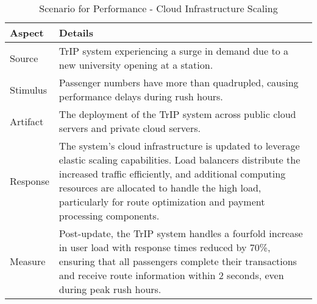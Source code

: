 \begin{table}[H]
    \centering
    \begin{tabularx}{\textwidth}{@{} lX @{}}
    \toprule
    \textbf{Aspect} & \textbf{Details} \\
    \midrule
    Source & TrIP system experiencing a surge in demand due to a new university opening at a station. \\
    Stimulus & Passenger numbers have more than quadrupled, causing performance delays during rush hours. \\
    Artifact & The deployment of the TrIP system across public cloud servers and private cloud servers. \\
    Response & The system's cloud infrastructure is updated to leverage elastic scaling capabilities. Load balancers distribute the increased traffic efficiently, and additional computing resources are allocated to handle the high load, particularly for route optimization and payment processing components. \\
    Measure & Post-update, the TrIP system handles a fourfold increase in user load with response times reduced by 70\%, ensuring that all passengers complete their transactions and receive route information within 2 seconds, even during peak rush hours. \\
    \bottomrule
    \end{tabularx}
    \caption{Scenario for Performance - Cloud Infrastructure Scaling}
    \label{table:performance_scaling}
\end{table}

